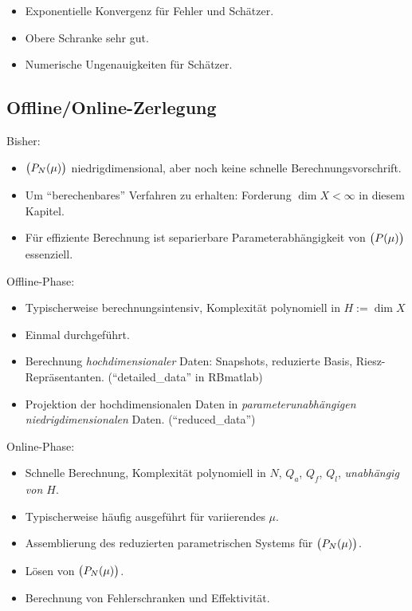 \begin{itemize}
	\item Exponentielle Konvergenz für Fehler und Schätzer.
	\item Obere Schranke sehr gut.
	\item Numerische Ungenauigkeiten für Schätzer.
\end{itemize}

\subsection{Offline/Online-Zerlegung} \label{sec-3.3}

Bisher:
\begin{itemize}
	\item $\big(P_N(\mu)\big)$ niedrigdimensional, aber noch keine schnelle Berechnungsvorschrift.
	\item Um ``berechenbares'' Verfahren zu erhalten: Forderung $\dim X < \infty$ in diesem Kapitel.
	\item Für effiziente Berechnung ist separierbare Parameterabhängigkeit von $\big(P(\mu)\big)$ essenziell.
\end{itemize}
Offline-Phase:
\begin{itemize}
	\item Typischerweise berechnungsintensiv, Komplexität polynomiell in $H := \dim X$
	\item Einmal durchgeführt.
	\item Berechnung \emph{hochdimensionaler} Daten: Snapshots, reduzierte Basis, Riesz-Repräsentanten. (``detailed\_data'' in RBmatlab)
	\item Projektion der hochdimensionalen Daten in \emph{parameterunabhängigen niedrigdimensionalen} Daten. (``reduced\_data'')
\end{itemize}
Online-Phase:
\begin{itemize}
	\item Schnelle Berechnung, Komplexität polynomiell in $N$, $Q_a$, $Q_f$, $Q_l$, \emph{unabhängig von $H$}.
	\item Typischerweise häufig ausgeführt für variierendes $\mu$.
	\item Assemblierung des reduzierten parametrischen Systems für $\big(P_N(\mu)\big)$.
	\item Lösen von $\big(P_N(\mu)\big)$.
	\item Berechnung von Fehlerschranken und Effektivität.
\end{itemize}


